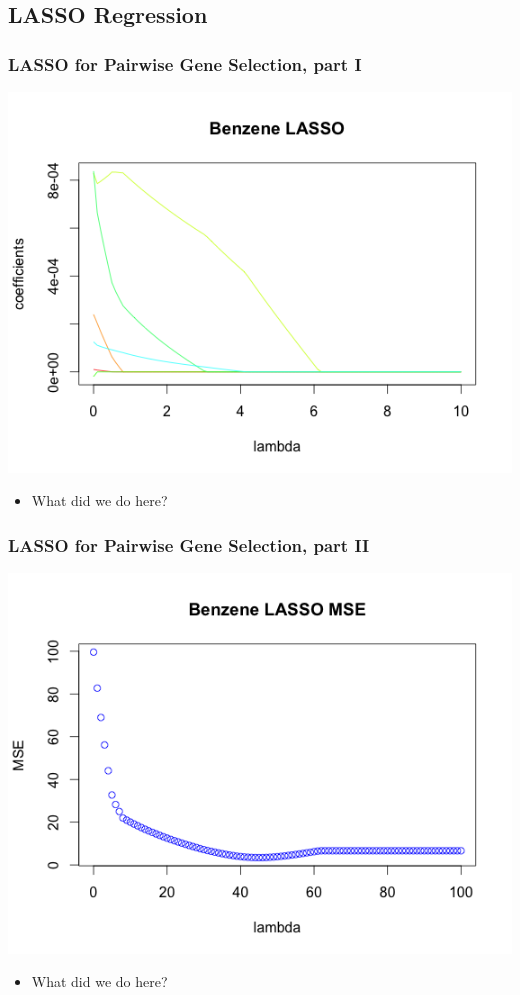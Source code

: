 \documentclass{beamer}
\begin{document}
\subsection{LASSO Regression}

\begin{frame}[fragile]
  	\frametitle{LASSO for Pairwise Gene Selection, part I}
		\centering
 		\includegraphics[scale=0.5]{../paper/figs/lasso_coef.png}
		\begin{itemize}
			\item What did we do here?
		\end{itemize}
\end{frame}

\begin{frame}[fragile]
        \frametitle{LASSO for Pairwise Gene Selection, part II}
		\centering
                \includegraphics[scale=0.5]{../paper/figs/lasso_mse.png} 
                \begin{itemize}
			\item What did we do here?
		\end{itemize}
\end{frame}
\end{document}
